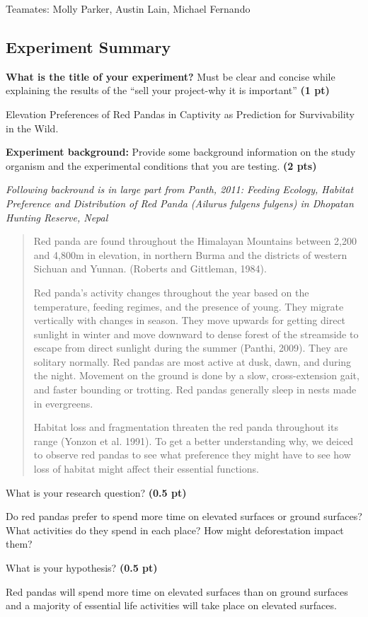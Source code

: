 \documentclass[12pt,a4paper]{article}
\begin{document}
Teamates: Molly Parker, Austin Lain, Michael Fernando

\subsection*{Experiment Summary}
\begin{enumerate}[font=\bfseries, wide]
    {\color{under}\item  \textbf{What is the title of your experiment?}  Must be clear and concise while explaining the results of the “sell your project-why it is important” \textbf{(1 pt)}}
    
    Elevation Preferences of Red Pandas in Captivity as Prediction for Survivability in the Wild.

    {\color{under}\item \textbf{ Experiment background:} Provide some background information on the study organism and the experimental conditions that you are testing. \textbf{(2 pts)}}
    
    \textit{Following backround is in large part from Panth, 2011: Feeding Ecology, Habitat Preference and Distribution of Red Panda (Ailurus fulgens fulgens) in Dhopatan Hunting Reserve, Nepal}

    \begin{quotation}
        Red panda are found throughout the Himalayan Mountains between 2,200 and 4,800m in elevation, in northern Burma and the districts of western Sichuan and Yunnan. (Roberts and Gittleman, 1984).

        Red panda's activity changes throughout the year based on the temperature, feeding regimes, and the presence of young. They migrate vertically with changes in season. They move upwards for getting direct sunlight in winter and move downward to dense forest of the streamside to escape from direct sunlight during the summer (Panthi, 2009). They are solitary normally. Red pandas are most active at dusk, dawn, and during the night. Movement on the ground is done by a slow, cross-extension gait, and faster bounding or trotting. Red pandas generally sleep in nests made in evergreens.
    
        Habitat loss and fragmentation threaten the red panda throughout its range (Yonzon et al. 1991). To get a better understanding why, we deiced to observe red pandas to see what preference they might have to see how loss of habitat might affect their essential functions.
    \end{quotation}
  \newpage 
    {\color{under}\item What is your research question? \textbf{(0.5 pt)}}

    Do red pandas prefer to spend more time on elevated surfaces or ground surfaces? What activities do they spend in each place? How might deforestation impact them?

    {\color{under}\item What is your hypothesis? \textbf{(0.5 pt)}}
    
    Red pandas will spend more time on elevated surfaces than on ground surfaces and a majority of essential life activities will take place on elevated surfaces.

\end{enumerate}
\end{document}
